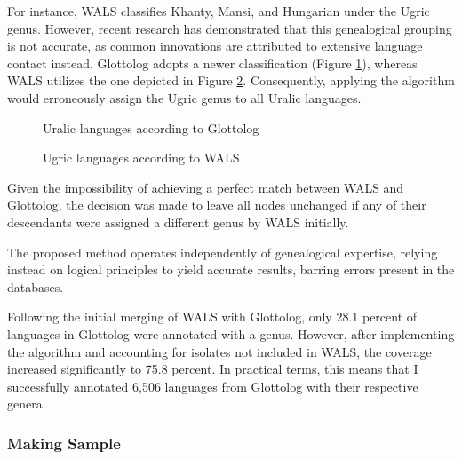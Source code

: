 For instance, WALS classifies Khanty, Mansi, and Hungarian under the Ugric genus. However, recent research has demonstrated that this genealogical grouping is not accurate, as common innovations are attributed to extensive language contact instead. Glottolog adopts a newer classification (Figure \ref{fig:new_uralic}), whereas WALS utilizes the one depicted in Figure \ref{fig:old_uralic}. Consequently, applying the algorithm would erroneously assign the Ugric genus to all Uralic languages.

\begin{figure}
	\caption{Uralic languages according to Glottolog}\label{fig:new_uralic}
\end{figure}

\begin{figure}
	\caption{Ugric languages according to WALS}\label{fig:old_uralic}
\end{figure}

Given the impossibility of achieving a perfect match between WALS and Glottolog, the decision was made to leave all nodes unchanged if any of their descendants were assigned a different genus by WALS initially.

The proposed method operates independently of genealogical expertise, relying instead on logical principles to yield accurate results, barring errors present in the databases.

Following the initial merging of WALS with Glottolog, only 28.1 percent of languages in Glottolog were annotated with a genus. However, after implementing the algorithm and accounting for isolates not included in WALS, the coverage increased significantly to 75.8 percent. In practical terms, this means that I successfully annotated 6,506 languages from Glottolog with their respective genera.

\subsubsection{Making Sample}

